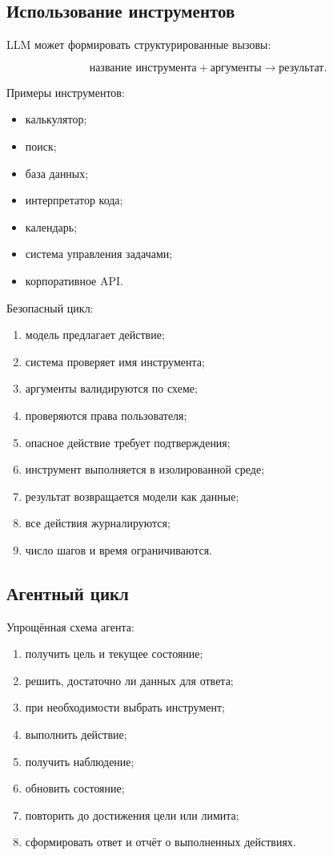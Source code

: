 \documentclass[12pt,a4paper]{article}
\newcommand{\1}{\mathbf{1}}
\theoremstyle{definition}
\theoremstyle{remark}
\begin{document}
\subsection{Использование инструментов}

LLM может формировать структурированные вызовы:

\[
\text{название инструмента}
+
\text{аргументы}
\longrightarrow
\text{результат}.
\]

Примеры инструментов:

\begin{itemize}
    \item калькулятор;
    \item поиск;
    \item база данных;
    \item интерпретатор кода;
    \item календарь;
    \item система управления задачами;
    \item корпоративное API.
\end{itemize}

Безопасный цикл:

\begin{enumerate}
    \item модель предлагает действие;
    \item система проверяет имя инструмента;
    \item аргументы валидируются по схеме;
    \item проверяются права пользователя;
    \item опасное действие требует подтверждения;
    \item инструмент выполняется в изолированной среде;
    \item результат возвращается модели как данные;
    \item все действия журналируются;
    \item число шагов и время ограничиваются.
\end{enumerate}

\subsection{Агентный цикл}

Упрощённая схема агента:

\begin{enumerate}
    \item получить цель и текущее состояние;
    \item решить, достаточно ли данных для ответа;
    \item при необходимости выбрать инструмент;
    \item выполнить действие;
    \item получить наблюдение;
    \item обновить состояние;
    \item повторить до достижения цели или лимита;
    \item сформировать ответ и отчёт о выполненных действиях.
\end{enumerate}
\end{document}
